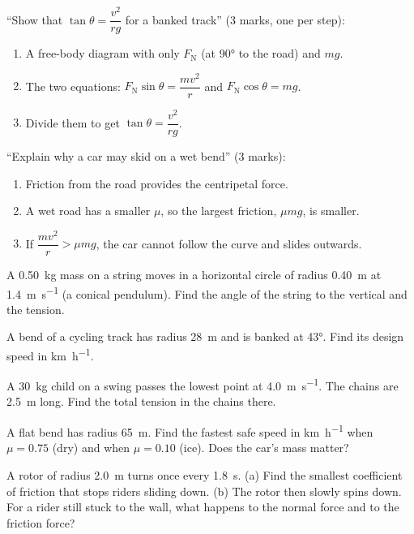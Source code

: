 \begin{examtip}
``Show that $\tan\theta = \dfrac{v^2}{rg}$ for a banked track'' (3 marks, one per step):
\begin{enumerate}
  \item A free-body diagram with only $F_\mathrm{N}$ (at \ang{90} to the road) and $mg$.
  \item The two equations: $F_\mathrm{N}\sin\theta = \dfrac{mv^2}{r}$ and
        $F_\mathrm{N}\cos\theta = mg$.
  \item Divide them to get $\tan\theta = \dfrac{v^2}{rg}$.
\end{enumerate}
``Explain why a car may skid on a wet bend'' (3 marks):
\begin{enumerate}
  \item Friction from the road provides the centripetal force.
  \item A wet road has a smaller $\mu$, so the largest friction, $\mu mg$, is smaller.
  \item If $\dfrac{mv^2}{r} > \mu mg$, the car cannot follow the curve and slides outwards.
\end{enumerate}
\end{examtip}

\begin{quickcheck}
  \item A \qty{0.50}{kg} mass on a string moves in a horizontal circle of radius
        \qty{0.40}{m} at \qty{1.4}{m.s^{-1}} (a conical pendulum). Find the angle of the
        string to the vertical and the tension.
  \item A bend of a cycling track has radius \qty{28}{m} and is banked at \ang{43}. Find
        its design speed in \si{km.h^{-1}}.
  \item A \qty{30}{kg} child on a swing passes the lowest point at \qty{4.0}{m.s^{-1}}. The
        chains are \qty{2.5}{m} long. Find the total tension in the chains there.
  \item A flat bend has radius \qty{65}{m}. Find the fastest safe speed in \si{km.h^{-1}}
        when $\mu = 0.75$ (dry) and when $\mu = 0.10$ (ice). Does the car's mass matter?
  \item A rotor of radius \qty{2.0}{m} turns once every \qty{1.8}{s}. (a) Find the smallest
        coefficient of friction that stops riders sliding down. (b) The rotor then slowly
        spins down. For a rider still stuck to the wall, what happens to the normal force
        and to the friction force?
\end{quickcheck}

